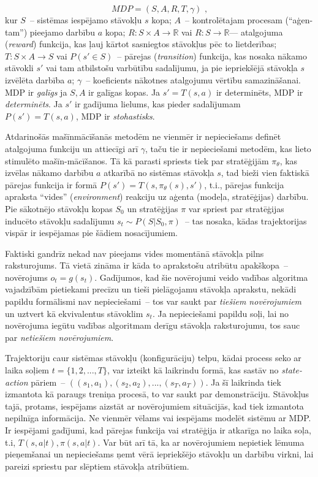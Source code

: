 \documentclass[12pt, a4paper]{article}
\numberwithin{equation}{section} %
\begin{document}
\begin{equation} 
    MDP = (S,A,R,T, \gamma)
\text{ ,}
\end{equation}
kur $S$~-- sistēmas iespējamo stāvokļu $s$ kopa; $A$~-- kontrolētajam procesam (``aģen-tam'') pieejamo darbību $a$ kopa; $R: S \times A \rightarrow \mathbb{R}$ vai $R: S \rightarrow \mathbb{R}$--- atalgojuma (\textit{reward}) funkcija, kas ļauj kārtot sasniegtos stāvokļus pēc to lietderības; $T: S \times A \rightarrow S$ vai $P(s' \in S)$~-- pārejas (\textit{transition}) funkcija, kas nosaka nākamo stāvokli $s'$ vai tam atbilstošu varbūtību sadalījumu, ja pie iepriekšējā stāvokļa $s$ izvēlēta darbība $a$; $\gamma$~-- koeficients nākotnes atalgojumu vērtību samazināšanai. MDP ir \textit{galīgs} ja $S,A$ ir galīgas kopas. Ja $s' = T(s,a)$ ir determinēts, MDP ir \textit{determinēts}. Ja $s'$ ir gadījuma lielums, kas pieder sadalījumam $P(s')=T(s,a)$, MDP ir \textit{stohastisks}.

Atdarinošās mašīnmācīšanās metodēm ne vienmēr ir nepieciešams definēt atalgojuma funkciju un attiecīgi arī $\gamma$, taču tie ir nepieciešami metodēm, kas lieto stimulēto mašīn-mācīšanos. Tā kā parasti spriests tiek par stratēģijām $\pi_{\theta}$, kas izvēlas nākamo darbību $a$ atkarībā no sistēmas stāvokļa $s$, tad bieži vien faktiskā pārejas funkcija ir formā $P(s') = T(s, \pi_{\theta}(s), s')$, t.i., pārejas funkcija apraksta ``vides'' (\textit{environment}) reakciju uz aģenta (modeļa, stratēģijas) darbību. Pie sākotnējo stāvokļu kopas $S_0$ un stratēģijas $\pi$ var spriest par stratēģijas inducēto stāvokļu sadalījumu $s_t \sim P(S \vert S_0, \pi)$~-- tas nosaka, kādas trajektorijas vispār ir iespējamas pie šādiem nosacījumiem. 

Faktiski gandrīz nekad nav pieejams vides momentānā stāvokļa pilns raksturojums. Tā vietā zināma ir kāda to aprakstošu atribūtu apakškopa~-- novērojums $o_t = g(s_t)$. Gadījumos, kad šie novērojumi veido vadības algoritma vajadzībām pietiekami precīzu un tieši pielāgojamu stāvokļa aprakstu, nekādi papildu formālismi nav nepieciešami~-- tos var saukt par \textit{tiešiem novērojumiem} un uztvert kā ekvivalentus stāvoklim $s_t$. Ja nepieciešami papildu soļi, lai no novērojuma iegūtu vadības algoritmam derīgu stāvokļa raksturojumu, tos sauc par \textit{netiešiem novērojumiem}.

Trajektoriju caur sistēmas stāvokļu (konfigurāciju) telpu, kādai process seko ar laika soļiem $t = \lbrace 1, 2, ..., T \rbrace$, var izteikt kā laikrindu formā, kas sastāv no \textit{state-action} pāriem~-- $((s_1, a_1), (s_2, a_2), ..., (s_T, a_T))$. Ja šī laikrinda tiek izmantota kā paraugs treniņa procesā, to var saukt par demonstrāciju. Stāvokļus tajā, protams, iespējams aizstāt ar novērojumiem situācijās, kad tiek izmantota nepilnīga informācija. Ne vienmēr vēlams vai iespējams modelēt sistēmu ar MDP. Ir iespējami gadījumi, kad pārejas funkcija vai stratēģija ir atkarīga no laika soļa, t.i, $T(s,a \vert t), \pi(s,a \vert t)$. Var būt arī tā, ka ar novērojumiem nepietiek lēmuma pieņemšanai un nepieciešams ņemt vērā iepriekšējo stāvokļu un darbību virkni, lai pareizi spriestu par slēptiem stāvokļa atribūtiem. 
\end{document}
